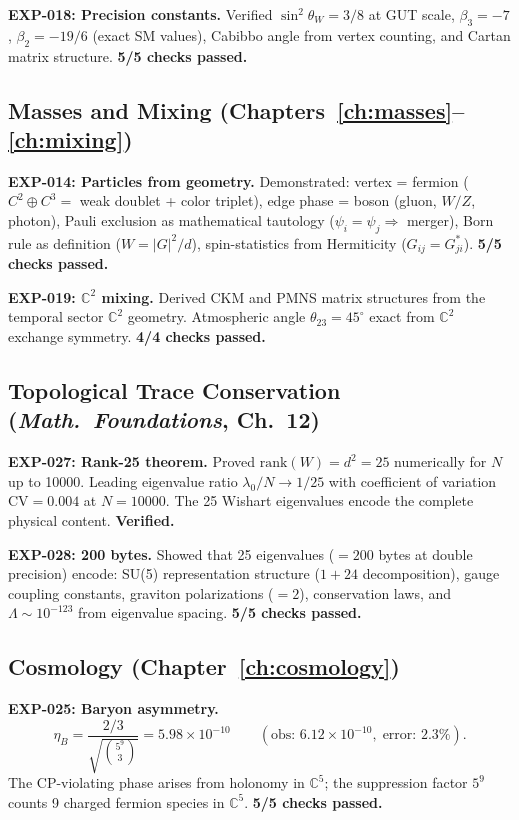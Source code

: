 \documentclass[12pt]{article}
\theoremstyle{remark}
\theoremstyle{definition}
\newcommand{\CC}{\mathbb{C}}
\begin{document}
\textbf{EXP-018: Precision constants.} Verified $\sin^2\theta_W = 3/8$ at GUT scale, $\beta_3 = -7$, $\beta_2 = -19/6$ (exact SM values), Cabibbo angle from vertex counting, and Cartan matrix structure. \textbf{5/5 checks passed.}

\subsection{Masses and Mixing (Chapters~\ref{ch:masses}--\ref{ch:mixing})}

\textbf{EXP-014: Particles from geometry.} Demonstrated: vertex = fermion ($C^2 \oplus C^3 =$ weak doublet + color triplet), edge phase = boson (gluon, $W/Z$, photon), Pauli exclusion as mathematical tautology ($\psi_i = \psi_j \Rightarrow$ merger), Born rule as definition ($W = |G|^2/d$), spin-statistics from Hermiticity ($G_{ij} = G_{ji}^*$). \textbf{5/5 checks passed.}

\textbf{EXP-019: $\CC^2$ mixing.} Derived CKM and PMNS matrix structures from the temporal sector $\CC^2$ geometry. Atmospheric angle $\theta_{23} = 45^\circ$ exact from $\CC^2$ exchange symmetry. \textbf{4/4 checks passed.}

\subsection{Topological Trace Conservation (\textit{Math.~Foundations}, Ch.~12)}

\textbf{EXP-027: Rank-25 theorem.} Proved $\text{rank}(W) = d^2 = 25$ numerically for $N$ up to 10000. Leading eigenvalue ratio $\lambda_0/N \to 1/25$ with coefficient of variation $\text{CV} = 0.004$ at $N = 10000$. The 25 Wishart eigenvalues encode the complete physical content. \textbf{Verified.}

\textbf{EXP-028: 200 bytes.} Showed that 25 eigenvalues ($= 200$ bytes at double precision) encode: SU(5) representation structure ($1 + 24$ decomposition), gauge coupling constants, graviton polarizations ($= 2$), conservation laws, and $\Lambda \sim 10^{-123}$ from eigenvalue spacing. \textbf{5/5 checks passed.}

\subsection{Cosmology (Chapter~\ref{ch:cosmology})}

\textbf{EXP-025: Baryon asymmetry.}
\begin{equation}
\eta_B = \frac{2/3}{\sqrt{\binom{5^9}{3}}} = 5.98 \times 10^{-10} \qquad (\text{obs: } 6.12 \times 10^{-10},\;\text{error: } 2.3\%).
\end{equation}
The CP-violating phase arises from holonomy in $\CC^5$; the suppression factor $5^9$ counts 9 charged fermion species in $\CC^5$. \textbf{5/5 checks passed.}
\end{document}
